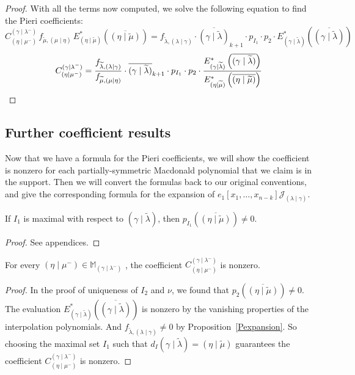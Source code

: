 \documentclass[ALCO]{cedram}
\newcommand{\Estar}[1]{E^*_{#1}}
\newcommand{\JJ}{\mathcal{J}_{(\lambda \mid \gamma)}}
\newcommand{\MM}{\mathbb{M}_{\gammalambdamin}}
\newcommand{\nudom}{{( \lambda \mid \gamma )}}
\newcommand{\lambdagamma}{{\nudom}}
\newcommand{\gammalambdamin}{{(\gamma \mid \lambda^-)}}
\newcommand{\etamu}{{(\eta \mid \mu^-)}}
\newcommand{\mueta}{{(\mu \mid \eta)}}
\newcommand{\mutilde}{{\widetilde{\mu}}}
\newcommand{\lambdatilde}{{\widetilde{\lambda}}}
\newcommand{\gammalambdatilde}{{(\gamma \mid \lambdatilde)}}
\newcommand{\flambdatilde}{f_{\lambdatilde , \lambdagamma}}
\newcommand{\etamutilde}{{(\eta \mid \widetilde{\mu})}}
\newcommand{\pIoneevaluated}{p_{I_1}\left(\overline{\etamutilde}\right)}
\newcommand{\pItwoevaluated}{p_{2}\left(\overline{\etamutilde}\right)}
\newcommand{\dI}{d_I}
\newcommand{\fmutilde}{f_{\mutilde, \mueta}}
\begin{document}
\begin{proof}
With all the terms now computed, we solve the following equation to find the Pieri coefficients:
\[
    C^{\gammalambdamin}_{\etamu}\, \fmutilde \,\Estar{\etamutilde} \left( \overline{\etamutilde}\right) = \flambdatilde \cdot \overline{\gammalambdatilde}_{k+1} \cdot p_{I_1} \cdot p_{2} \cdot \Estar{\gammalambdatilde}\left(\overline{\gammalambdatilde} \right)\]
   \[ C^{\gammalambdamin}_{\etamu} = \frac{\flambdatilde}{\fmutilde} \cdot \overline{\gammalambdatilde}_{k+1} \cdot p_{I_1} \cdot p_{2} \cdot \frac{\Estar{\gammalambdatilde}\left(\overline{\gammalambdatilde} \right)}{\Estar{\etamutilde} \left( \overline{\etamutilde}\right)}\qedhere
\]
\end{proof}
\vspace*{.3cm}

    
    \subsection{Further coefficient results}
Now that we have a formula for the Pieri coefficients, we will show the coefficient is nonzero for each partially-symmetric Macdonald polynomial that we claim is in the support. Then we will convert the formulas back to our original conventions, and give the corresponding formula for the expansion of $e_1[x_1,\dots, x_{n-k}] \JJ$.



\begin{lemm}\label{nonzero}
If $I_1$ is maximal with respect to $\gammalambdatilde$, then $\pIoneevaluated \neq 0$.
\end{lemm}
\begin{proof}
    See appendices.
\end{proof}

\begin{coro}\label{support}
For every $\etamu \in \MM$ , the coefficient $C^{\gammalambdamin}_{\etamu}$ is nonzero.
\end{coro}
\begin{proof}
In the proof of uniqueness of $I_2$ and $\nu$, we found that $\pItwoevaluated \neq 0$. The evaluation $\Estar{\gammalambdatilde} \left(\overline{\gammalambdatilde} \right)$ is nonzero by the vanishing properties of the interpolation polynomials. And $\flambdatilde \neq 0$ by Proposition~\ref{Pexpansion}. So choosing the maximal set $I_1$ such that $\dI{\gammalambdatilde} = \etamutilde$ guarantees the coefficient $C^\gammalambdamin_{\etamu}$ is nonzero.
\end{proof}
\end{document}
